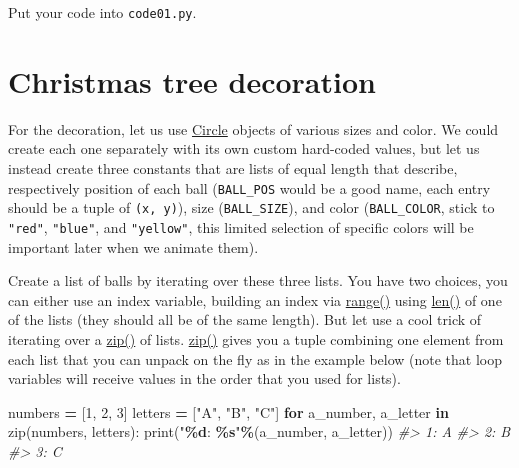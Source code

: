 \documentclass[
]{book}
\newenvironment{Shaded}{\begin{snugshade}}{\end{snugshade}}
\newcommand{\BuiltInTok}[1]{#1}
\newcommand{\CommentTok}[1]{\textcolor[rgb]{0.56,0.35,0.01}{\textit{#1}}}
\newcommand{\ControlFlowTok}[1]{\textcolor[rgb]{0.13,0.29,0.53}{\textbf{#1}}}
\newcommand{\DecValTok}[1]{\textcolor[rgb]{0.00,0.00,0.81}{#1}}
\newcommand{\KeywordTok}[1]{\textcolor[rgb]{0.13,0.29,0.53}{\textbf{#1}}}
\newcommand{\NormalTok}[1]{#1}
\newcommand{\OperatorTok}[1]{\textcolor[rgb]{0.81,0.36,0.00}{\textbf{#1}}}
\newcommand{\SpecialCharTok}[1]{\textcolor[rgb]{0.81,0.36,0.00}{\textbf{#1}}}
\newcommand{\StringTok}[1]{\textcolor[rgb]{0.31,0.60,0.02}{#1}}
\begin{document}
Put your code into \texttt{code01.py}.

\hypertarget{christmas-tree-decoration}{%
\section{Christmas tree decoration}\label{christmas-tree-decoration}}

For the decoration, let us use \href{https://psychopy.org/api/visual/circle.html\#psychopy.visual.circle.Circle}{Circle} objects of various sizes and color. We could create each one separately with its own custom hard-coded values, but let us instead create three constants that are lists of equal length that describe, respectively position of each ball (\texttt{BALL\_POS} would be a good name, each entry should be a tuple of \texttt{(x,\ y)}), size (\texttt{BALL\_SIZE}), and color (\texttt{BALL\_COLOR}, stick to \texttt{"red"}, \texttt{"blue"}, and \texttt{"yellow"}, this limited selection of specific colors will be important later when we animate them).

Create a list of balls by iterating over these three lists. You have two choices, you can either use an index variable, building an index via \href{https://docs.python.org/3/library/functions.html\#func-range}{range()} using \href{https://docs.python.org/3/library/functions.html\#len}{len()} of one of the lists (they should all be of the same length). But let use a cool trick of iterating over a \href{https://docs.python.org/3/library/functions.html\#zip}{zip()} of lists. \href{https://docs.python.org/3/library/functions.html\#zip}{zip()} gives you a tuple combining one element from each list that you can unpack on the fly as in the example below (note that loop variables will receive values in the order that you used for lists).

\begin{Shaded}
\begin{Highlighting}[]
\NormalTok{numbers }\OperatorTok{=}\NormalTok{ [}\DecValTok{1}\NormalTok{, }\DecValTok{2}\NormalTok{, }\DecValTok{3}\NormalTok{]}
\NormalTok{letters }\OperatorTok{=}\NormalTok{ [}\StringTok{"A"}\NormalTok{, }\StringTok{"B"}\NormalTok{, }\StringTok{"C"}\NormalTok{]}
\ControlFlowTok{for}\NormalTok{  a\_number, a\_letter }\KeywordTok{in}  \BuiltInTok{zip}\NormalTok{(numbers, letters):}
  \BuiltInTok{print}\NormalTok{(}\StringTok{"}\SpecialCharTok{\%d}\StringTok{: }\SpecialCharTok{\%s}\StringTok{"}\OperatorTok{\%}\NormalTok{(a\_number, a\_letter))}
\CommentTok{\#\textgreater{} 1: A}
\CommentTok{\#\textgreater{} 2: B}
\CommentTok{\#\textgreater{} 3: C}
\end{Highlighting}
\end{Shaded}
\end{document}
